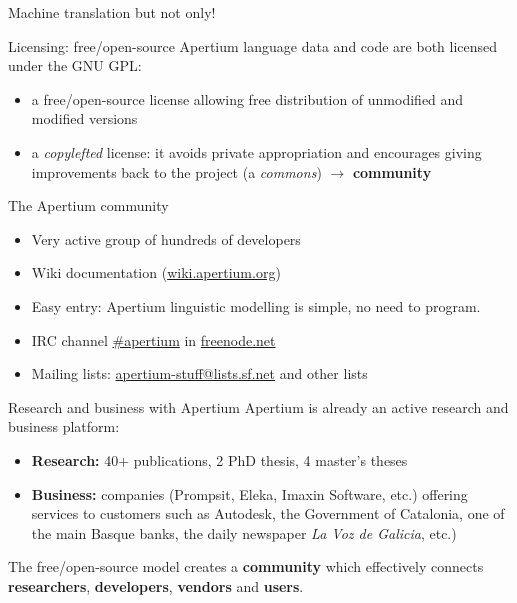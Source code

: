 \documentclass[final]{beamer} %
\newlength{\wideitemsep}
\let\olditem\item
\renewcommand{\item}{\setlength{\itemsep}{\wideitemsep}\olditem}
\begin{document}
\begin{frame}
\begin{columns}
\begin{column}{0.5\textwidth}
\begin{block}{Machine translation but not only!}
\end{block}

\begin{block}{Licensing: free/open-source}
Apertium language data and code are both licensed under the GNU GPL:\begin{itemize}
\item a free/open-source license allowing free distribution of unmodified and modified versions
\item a \textit{copylefted} license: it avoids private appropriation and encourages giving improvements back to the project (a \textit{commons}) \(\to\) \textbf{community}
\end{itemize}
\end{block}

\begin{block}{The Apertium community}
\begin{itemize}
\item Very active group of hundreds of developers 
\item Wiki documentation (\url{wiki.apertium.org})
\item Easy entry: Apertium linguistic modelling is simple, no need to program.
\item IRC channel \url{\#apertium} in \url{freenode.net}
\item Mailing lists: \url{apertium-stuff@lists.sf.net} and other lists
\end{itemize}

\end{block}




\begin{block}{Research and business with Apertium}
  Apertium is already an active research and business platform:
  \begin{itemize}
    \item \textbf{Research:} 40+ publications, 2 PhD thesis, 4 master's theses
    \item \textbf{Business:} companies (Prompsit, Eleka,
      Imaxin Software, etc.) offering services to customers such as
      Autodesk, the Government of Catalonia, one of the main Basque
      banks, the daily newspaper \emph{La Voz de Galicia}, etc.)
  \end{itemize}
  The free/open-source model creates a \textbf{community} which effectively
  connects \textbf{researchers}, \textbf{developers}, \textbf{vendors} and \textbf{users}.
\end{block}


\end{column}
\end{columns}
\end{frame}
\end{document}
